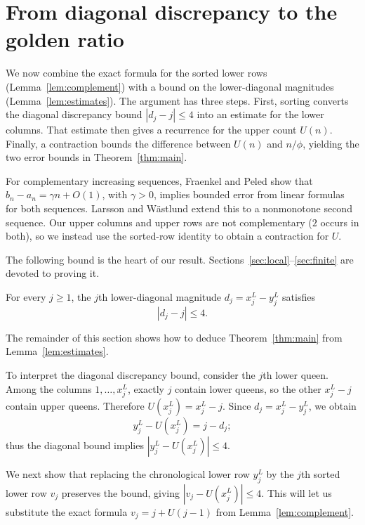 \section{From diagonal discrepancy to the golden ratio}\label{sec:contraction}
We now combine the exact formula for the sorted lower rows (Lemma~\ref{lem:complement}) with a bound
on the lower-diagonal magnitudes (Lemma~\ref{lem:estimates}). The argument has three steps. First,
sorting converts the diagonal discrepancy bound $|d_j-j|\le4$ into an estimate for the lower
columns. That estimate then gives a recurrence for the upper count
$U(n)$. Finally, a contraction bounds the difference between $U(n)$ and
$n/\phi$, yielding the two error bounds in Theorem~\ref{thm:main}.

For complementary increasing sequences, Fraenkel and Peled
\cite[Theorem~4.3]{FP} show that $b_n-a_n=\gamma n+O(1)$, with $\gamma>0$,
implies bounded error from linear formulas for both sequences.
Larsson and W\"astlund \cite[Lemma~2.3]{LW} extend this to a nonmonotone
second sequence. Our upper columns and upper rows are not complementary
($2$ occurs in both), so we instead use the sorted-row identity to
obtain a contraction for $U$.

The following bound is the heart of our result. Sections~\ref{sec:local}--\ref{sec:finite} are devoted to proving it.
\begin{lemma}\label{lem:estimates}
For every $j\ge1$, the $j$th lower-diagonal magnitude $d_j=x_j^L-y_j^L$ satisfies
\begin{equation}\label{eq:rank}
 |d_j-j|\le4.
\end{equation}
\end{lemma}
The remainder of this section shows how to deduce
Theorem~\ref{thm:main} from Lemma~\ref{lem:estimates}.

To interpret the diagonal discrepancy bound,
consider the $j$th lower queen. Among the columns $1,\ldots,x_j^L$,
exactly $j$ contain lower queens, so the other $x_j^L-j$ contain upper
queens. Therefore $U(x_j^L)=x_j^L-j$. Since $d_j=x_j^L-y_j^L$, we obtain
\begin{equation}\label{eq:rank-row}
 y_j^L-U(x_j^L)=j-d_j;
\end{equation}
thus the diagonal bound implies $|y_j^L-U(x_j^L)|\le4$. 

We next show
that replacing the chronological lower row $y_j^L$ by the $j$th sorted
lower row $v_j$ preserves the bound, giving $|v_j-U(x_j^L)|\le4$. This will let us
substitute the exact formula $v_j=j+U(j-1)$ from
Lemma~\ref{lem:complement}.

